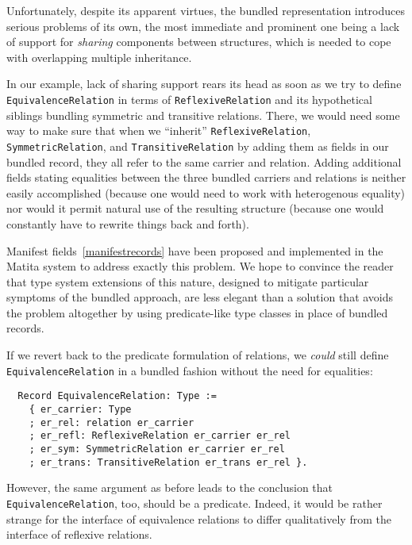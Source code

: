 \documentclass[a4paper,10pt,runningheads]{llncs}
\begin{document}

Unfortunately, despite its apparent virtues, the bundled representation introduces serious problems of its own, the most immediate and prominent one being a lack of support for \emph{sharing} components between structures, which is needed to cope with overlapping multiple inheritance.

In our example, lack of sharing support rears its head as soon as we try to define \lstinline|EquivalenceRelation| in terms of \lstinline|ReflexiveRelation| and its hypothetical siblings bundling symmetric and transitive relations. There, we would need some way to make sure that when we ``inherit'' \lstinline|ReflexiveRelation|, \lstinline|SymmetricRelation|, and \lstinline|TransitiveRelation| by adding them as fields in our bundled record, they all refer to the same carrier and relation. Adding additional fields stating equalities between the three bundled carriers and relations is neither easily accomplished (because one would need to work with heterogenous equality) nor would it permit natural use of the resulting structure (because one would constantly have to rewrite things back and forth).

Manifest fields~\ref{manifestrecords} have been proposed and implemented in the Matita system to address exactly this problem. We hope to convince the reader that type system extensions of this nature, designed to mitigate particular symptoms of the bundled approach, are less elegant than a solution that avoids the problem altogether by using predicate-like type classes in place of bundled records.

If we revert back to the predicate formulation of relations, we \emph{could} still define \lstinline|EquivalenceRelation| in a bundled fashion without the need for equalities:
\begin{lstlisting}
  Record EquivalenceRelation: Type :=
    { er_carrier: Type
    ; er_rel: relation er_carrier
    ; er_refl: ReflexiveRelation er_carrier er_rel
    ; er_sym: SymmetricRelation er_carrier er_rel
    ; er_trans: TransitiveRelation er_trans er_rel }.
\end{lstlisting}
However, the same argument as before leads to the conclusion that \mbox{\lstinline|EquivalenceRelation|,} too, should be a predicate. Indeed, it would be rather strange for the interface of equivalence relations to differ qualitatively from the interface of reflexive relations.
\end{document}
